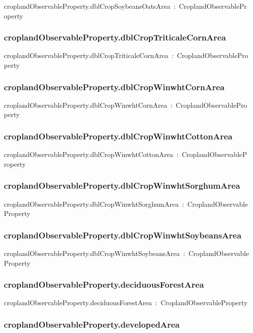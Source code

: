 \documentclass{article}
\begin{document}
croplandObservableProperty.dblCropSoybeansOatsArea~:~CroplandObservableProperty

\subsubsection*{croplandObservableProperty.dblCropTriticaleCornArea}

croplandObservableProperty.dblCropTriticaleCornArea~:~CroplandObservableProperty

\subsubsection*{croplandObservableProperty.dblCropWinwhtCornArea}

croplandObservableProperty.dblCropWinwhtCornArea~:~CroplandObservableProperty

\subsubsection*{croplandObservableProperty.dblCropWinwhtCottonArea}

croplandObservableProperty.dblCropWinwhtCottonArea~:~CroplandObservableProperty

\subsubsection*{croplandObservableProperty.dblCropWinwhtSorghumArea}

croplandObservableProperty.dblCropWinwhtSorghumArea~:~CroplandObservableProperty

\subsubsection*{croplandObservableProperty.dblCropWinwhtSoybeansArea}

croplandObservableProperty.dblCropWinwhtSoybeansArea~:~CroplandObservableProperty

\subsubsection*{croplandObservableProperty.deciduousForestArea}

croplandObservableProperty.deciduousForestArea~:~CroplandObservableProperty

\subsubsection*{croplandObservableProperty.developedArea}
\end{document}
